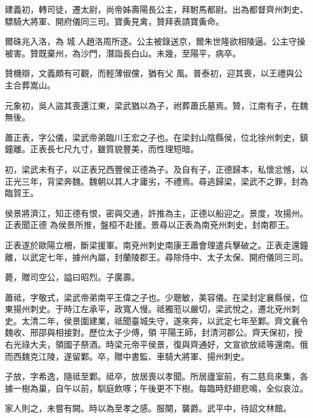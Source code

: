 \begin{pinyinscope}
 建義初，轉司徒，遷太尉，尚帝姊壽陽長公主，拜駙馬都尉。出為都督齊州刺史、驃騎大將軍、開府儀同三司。寶夤見禽，贊拜表請寶夤命。



 爾硃兆入洛，為
 城
 人趙洛周所逐。公主被錄送京，爾朱世隆欲相陵逼。公主守操被害。贊既棄州，為沙門，潛詣長白山。未幾，至陽平，病卒。



 贊機辯，文義頗有可觀，而輕薄俶儻，猶有父
 風。普泰初，迎其喪，以王禮與公主合葬嵩山。



 元象初，吳人盜其喪還江東，梁武猶以為子，祔葬蕭氏墓焉。贊，江南有子，在魏無後。



 蕭正表，字公儀，梁武帝弟臨川王宏之子也。在梁封山陰縣侯，位北徐州刺史，鎮鐘離。正表長七尺九寸，雖質貌豐美，而性理短暗。



 初，梁武未有子，以正表兄西豐侯正德為子。及自有子，正德歸本，私懷忿憾，以正光三年，背梁奔魏。魏朝以其人才庸劣，不禮焉。尋逃歸梁，梁武不之罪，封為臨賀王。



 侯景將濟江，知正德有恨，密與交通，許推為主，正德以船迎之。景度，攻揚州。正表聞正德
 為侯景所推，盤桓不赴援。景尋以正表為南兗州刺史，封南郡王。



 正表遂於歐陽立柵，斷梁援軍。南兗州刺史南康王蕭會理遣兵擊破之。正表走還鐘離，以武定七年，據州內屬，封蘭陵郡王。尋除侍中、太子太保、開府儀同三司。



 薨，贈司空公，謚曰昭烈。子廣壽。



 蕭祗，字敬式，梁武帝弟南平王偉之子也。少聰敏，美容儀。在梁封定襄縣侯，位東揚州刺史。于時江左承平，政寬人慢。祗獨蒞以嚴切，梁武悅之，遷北兗州刺史。太清二年，侯景圍建業，祗聞臺城失守，遂來奔，以武定七年至鄴。齊文襄令魏收、邢邵與相接對。歷位太子少傅，領
 平陽王師，封清河郡公。齊天保初，授右光祿大夫，領國子祭酒。時梁元帝平侯景，復與齊通好，文宣欲放祗等還南。俄而西魏克江陵，遂留鄴。卒，贈中書監、車騎大將軍、揚州刺史。



 子放，字希逸，隨祗至鄴。祗卒，放居喪以孝聞。所居廬室前，有二慈烏來集，各據一樹為巢，自午以前，馴庭飲啄；午後更不下樹。每臨時舒翅悲鳴，全似哀泣。



 家人則之，未嘗有闕。時以為至孝之感。服闋，襲爵。武平中，待詔文林館。




\end{pinyinscope}
